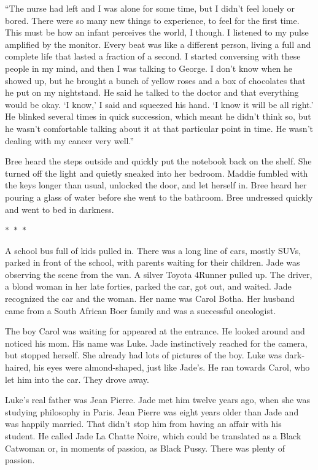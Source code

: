\documentclass{memoir}
\newcommand{\starbreak}{%
\begin{center}
  $\ast$~$\ast$~$\ast$
\end{center}
}
\begin{document}
``The nurse had left and I was alone for some time, but I didn't feel lonely or bored. There were so many new things to experience, to feel for the first time. This must be how an infant perceives the world, I though. I listened to my pulse amplified by the monitor. Every beat was like a different person, living a full and complete life that lasted a fraction of a second. I started conversing with these people in my mind, and then I was talking to George. I don't know when he showed up, but he brought a bunch of yellow roses and a box of chocolates that he put on my nightstand. He said he talked to the doctor and that everything would be okay. `I know,' I said and squeezed his hand. `I know it will be all right.' He blinked several times in quick succession, which meant he didn't think so, but he wasn't comfortable talking about it at that particular point in time. He wasn't dealing  with my cancer very well.''

Bree heard the steps outside and quickly put the notebook back on the shelf. She turned off the light and quietly sneaked into her bedroom. Maddie fumbled with the keys longer than usual, unlocked the door, and let herself in. Bree heard her pouring a glass of water before she went to the bathroom. Bree undressed quickly and went to bed in darkness. 

\starbreak

A school bus full of kids pulled in. There was a long line of cars, mostly SUVs, parked in front of the school, with parents waiting for their children. Jade was observing the scene from the van. A silver Toyota 4Runner pulled up. The driver, a blond woman in her late forties, parked the car, got out, and waited. Jade recognized the car and the woman. Her name was Carol Botha. Her husband came from a South African Boer family and was a successful oncologist. 

The boy Carol was waiting for appeared at the entrance. He looked around and noticed his mom. His name was Luke. Jade instinctively reached for the camera, but stopped herself. She already had lots of pictures of the boy. Luke was dark-haired, his eyes were almond-shaped, just like Jade's. He ran towards Carol, who let him into the car. They drove away.

Luke's real father was Jean Pierre. Jade met him twelve years ago, when she was studying philosophy in Paris. Jean Pierre was eight years older than Jade and was happily married. That didn't stop him from having an affair with his student. He called Jade La Chatte Noire, which could be translated as a Black Catwoman or, in moments of passion, as Black Pussy. There was plenty of passion. 
\end{document}
